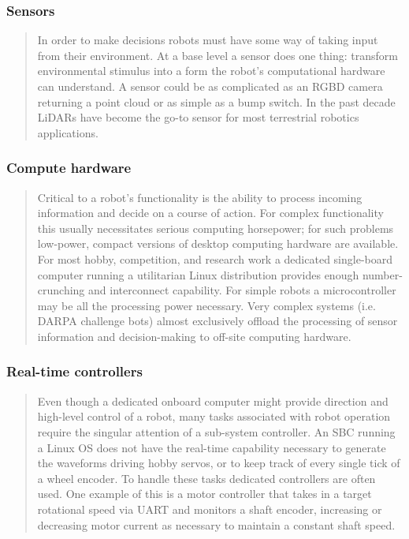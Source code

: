 \hypertarget{sensors}{%
\subsubsection{Sensors}\label{sensors}}

\begin{quote}
In order to make decisions robots must have some way of taking input
from their environment. At a base level a sensor does one thing:
transform environmental stimulus into a form the robot's computational
hardware can understand. A sensor could be as complicated as an RGBD
camera returning a point cloud or as simple as a bump switch. In the
past decade LiDARs have become the go-to sensor for most terrestrial
robotics applications.
\end{quote}

\hypertarget{compute-hardware}{%
\subsubsection{Compute hardware}\label{compute-hardware}}

\begin{quote}
Critical to a robot's functionality is the ability to process incoming
information and decide on a course of action. For complex functionality
this usually necessitates serious computing horsepower; for such
problems low-power, compact versions of desktop computing hardware are
available. For most hobby, competition, and research work a dedicated
single-board computer running a utilitarian Linux distribution provides
enough number-crunching and interconnect capability. For simple robots a
microcontroller may be all the processing power necessary. Very complex
systems (i.e. DARPA challenge bots) almost exclusively offload the
processing of sensor information and decision-making to off-site
computing hardware.
\end{quote}

\hypertarget{real-time-controllers}{%
\subsubsection{Real-time controllers}\label{real-time-controllers}}

\begin{quote}
Even though a dedicated onboard computer might provide direction and
high-level control of a robot, many tasks associated with robot
operation require the singular attention of a sub-system controller. An
SBC running a Linux OS does not have the real-time capability necessary
to generate the waveforms driving hobby servos, or to keep track of
every single tick of a wheel encoder. To handle these tasks dedicated
controllers are often used. One example of this is a motor controller
that takes in a target rotational speed via UART and monitors a shaft
encoder, increasing or decreasing motor current as necessary to maintain
a constant shaft speed.
\end{quote}
